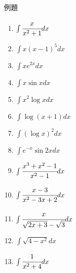 \documentclass[10pt,dvipdfmx]{jsarticle}
\begin{document}
\begin{itembox}[l]{例題}
  \begin{large}
    \begin{enumerate}
      \item $\int \cfrac{x}{x^2+1}dx$\vspace{10mm}
      \item $\int x(x-1)^5dx$\vspace{10mm}
      \item $\int xe^{2x}dx$\vspace{10mm}
      \item $\int x\sin xdx$\vspace{10mm}
      \item $\int x^2\log xdx$\vspace{10mm}
      \item $\int \log(x+1)dx$\vspace{10mm}
      \item $\int (\log x)^2dx$\vspace{10mm}
      \item $\int e^{-x}\sin 2xdx$\vspace{10mm}
      \item $\int \cfrac{x^3+x^2-1}{x^2-1}dx$\vspace{10mm}
      \item $\int \cfrac{x-3}{x^2-3x+2}dx$\vspace{10mm}
      \item $\int \cfrac{x}{\sqrt{2x+3}-\sqrt{3}}dx$\vspace{10mm}
      \item $\int \sqrt{4-x^2}dx$\vspace{10mm}
      \item $\int \cfrac{1}{x^2+4}dx$\vspace{10mm}
    \end{enumerate}
  \end{large}
\end{itembox}
\end{document}

